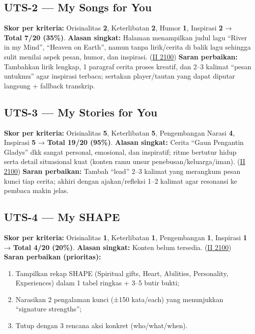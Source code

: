 \documentclass[
  letterpaper,
  DIV=11,
  numbers=noendperiod]{scrreprt}
\providecommand{\tightlist}{%
  \setlength{\itemsep}{0pt}\setlength{\parskip}{0pt}}
\begin{document}
\subsection{UTS-2 --- My Songs for You}\label{uts-2-my-songs-for-you-1}

\textbf{Skor per kriteria:} Orisinalitas \textbf{2}, Keterlibatan
\textbf{2}, Humor \textbf{1}, Inspirasi \textbf{2} → \textbf{Total 7/20
(35\%)}. \textbf{Alasan singkat:} Halaman menampilkan judul lagu ``River
in my Mind'', ``Heaven on Earth'', namun tanpa lirik/cerita di balik
lagu sehingga sulit menilai aspek pesan, humor, dan inspirasi.
(\href{https://ii-2100.github.io/all-about-me/My_Song_for_You/index.html}{II
2100}) \textbf{Saran perbaikan:} Tambahkan lirik lengkap, 1 paragraf
cerita proses kreatif, dan 2--3 kalimat ``pesan untukmu'' agar inspirasi
terbaca; sertakan player/tautan yang dapat diputar langsung + fallback
transkrip.

\subsection{UTS-3 --- My Stories for
You}\label{uts-3-my-stories-for-you-1}

\textbf{Skor per kriteria:} Orisinalitas \textbf{5}, Keterlibatan
\textbf{5}, Pengembangan Narasi \textbf{4}, Inspirasi \textbf{5} →
\textbf{Total 19/20 (95\%)}. \textbf{Alasan singkat:} Cerita ``Gaun
Pengantin Gladys'' dkk sangat personal, emosional, dan inspiratif; ritme
bertutur hidup serta detail situasional kuat (konten ramu unsur
penebusan/keluarga/iman).
(\href{https://ii-2100.github.io/all-about-me/My_Stories_for_You/index.html}{II
2100}) \textbf{Saran perbaikan:} Tambah ``lead'' 2--3 kalimat yang
merangkum pesan kunci tiap cerita; akhiri dengan ajakan/refleksi 1--2
kalimat agar resonansi ke pembaca makin jelas.

\subsection{UTS-4 --- My SHAPE}\label{uts-4-my-shape-1}

\textbf{Skor per kriteria:} Orisinalitas \textbf{1}, Keterlibatan
\textbf{1}, Pengembangan \textbf{1}, Inspirasi \textbf{1} →
\textbf{Total 4/20 (20\%)}. \textbf{Alasan singkat:} Konten belum
tersedia.
(\href{https://ii-2100.github.io/all-about-me/My_Shapes/index.html}{II
2100}) \textbf{Saran perbaikan (prioritas):}

\begin{enumerate}
\def\labelenumi{\arabic{enumi}.}
\tightlist
\item
  Tampilkan rekap SHAPE (Spiritual gifts, Heart, Abilities, Personality,
  Experiences) dalam 1 tabel ringkas + 3--5 butir bukti;
\item
  Narasikan 2 pengalaman kunci (±150 kata/each) yang menunjukkan
  ``signature strengths'';
\item
  Tutup dengan 3 rencana aksi konkret (who/what/when).
\end{enumerate}
\end{document}
